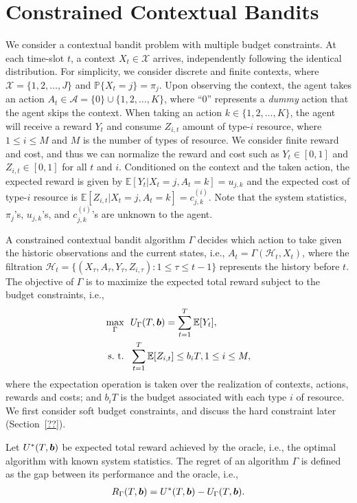 
\section{Constrained Contextual Bandits} \label{sys_model}

We consider a contextual bandit problem with multiple budget constraints.  
At each time-slot $t$, a context $X_t \in \mathcal{X}$ arrives, independently following the identical distribution.
For simplicity, we consider discrete and finite contexts, where $\mathcal{X} = \{1,2, \ldots, J\}$ and $\mathbb{P}\{X_t = j\} = \pi_j$.  
Upon observing the context, the agent takes an action $A_t \in \mathcal{A} = \{0\} \cup \{1, 2, \ldots, K\}$, where ``0'' represents a \emph{dummy} action that the agent skips the context. 
When taking an action $k \in \{1, 2, \ldots, K\}$, the agent will receive a reward $Y_t$ and consume $Z_{i,t}$ amount of type-$i$ resource, where $1\leq i \leq M$ and $M$ is the number of types of resource. 
We consider finite reward and cost, and thus we can normalize the reward and cost such as $Y_t \in [0,1]$ and $Z_{i,t} \in [0,1]$ for all $t$ and $i$. Conditioned on the context and the taken action, the expected reward is given by $\mathbb{E}[Y_t | X_t = j, A_t = k] = u_{j,k}$ and the expected cost of type-$i$ resource is $\mathbb{E}[Z_{i,t}|X_t = j, A_t = k] = c_{j,k}^{(i)}$.
Note that the system statistics, $\pi_j$'s, $u_{j,k}$'s, and $c_{j,k}^{(i)}$'s are unknown to the agent. 

A constrained contextual bandit algorithm $\Gamma$ decides which action to take given the historic observations and the current states, i.e.,  $A_t = \Gamma(\mathcal{H}_{t}, X_t)$, where the filtration $\mathcal{H}_{t} = \{(X_\tau, A_\tau, Y_{\tau}, Z_{i,\tau}): 1 \leq \tau \leq t - 1 \}$ represents the history before $t$.  The objective of $\Gamma$ is to maximize the expected total reward subject to the budget constraints, i.e.,
\begin{align}
\underset{\Gamma}{\text{max}} &~~ U_{\Gamma}(T, \boldsymbol{b}) =\sum_{t = 1}^T \mathbb{E}[Y_t],\\
\text{s.~t.} &~~ \sum_{t = 1}^T \mathbb{E}[Z_{i,t}] \leq b_i T, 1 \leq i \leq M,
\end{align}
where the expectation operation is taken over the realization of contexts, actions, rewards and costs; and $b_i T$ is the budget associated with each type $i$ of resource. We first consider soft budget constraints, and discuss the hard constraint later (Section~\ref{??}).

Let $U^*(T, \boldsymbol{b})$ be expected total reward achieved by the oracle, i.e., the optimal algorithm with known system statistics. The regret of an algorithm $\Gamma$ is defined as the gap between its performance and the oracle, i.e.,
\begin{eqnarray}
R_{\Gamma}(T, \boldsymbol{b}) = U^*(T, \boldsymbol{b}) - U_{\Gamma}(T, \boldsymbol{b}).
\end{eqnarray}

